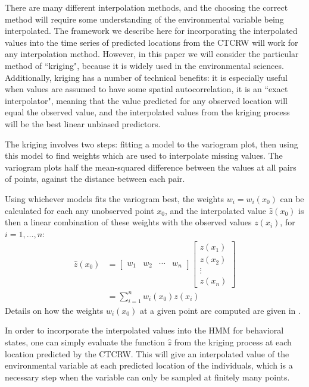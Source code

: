 \documentclass[12pt]{article}
\begin{document}
	There are many different interpolation methods, and the choosing the correct method will require some understanding of the environmental variable being interpolated. The framework we describe here for incorporating the interpolated values into the time series of predicted locations from the CTCRW will work for any interpolation method. However, in this paper we will consider the particular method of ``kriging", because it is widely used in the environmental sciences. Additionally, kriging has a number of technical benefits: it is especially useful when values are assumed to have some spatial autocorrelation, it is an ``exact interpolator", meaning that the value predicted for any observed location will equal the observed value, and the interpolated values from the kriging process will be the best linear unbiased predictors.
	
	The kriging involves two steps: fitting a model to the variogram plot, then using this model to find weights which are used to interpolate missing values. The variogram plots half the mean-squared difference between the values at all pairs of points, against the distance between each pair. 
	
	Using whichever models fits the variogram best, the weights $w_i = w_i(x_0)$ can be calculated for each any unobserved point $x_0$, and the interpolated value $\hat z(x_0)$ is then a linear combination of these weights with the observed values $z(x_i)$, for $i = 1, \ldots, n$:
	\begin{align*}
		\hat z(x_0) &= \begin{bmatrix} w_1 & w_2 & \cdots & w_n \end{bmatrix} \begin{bmatrix} z(x_1) \\ z(x_2) \\ \vdots \\ z(x_n) \end{bmatrix} \\
		&= \sum_{i = 1}^n w_i(x_0) z(x_i)
	\end{align*}
	Details on how the weights $w_i(x_0)$ at a given point are computed are given in \cite{Bailey1995}.
	
	In order to incorporate the interpolated values into the HMM for behavioral states, one can simply evaluate the function $\hat z$ from the kriging process at each location predicted by the CTCRW. This will give an interpolated value of the environmental variable at each predicted location of the individuals, which is a necessary step when the variable can only be sampled at finitely many points.
	
\end{document}
